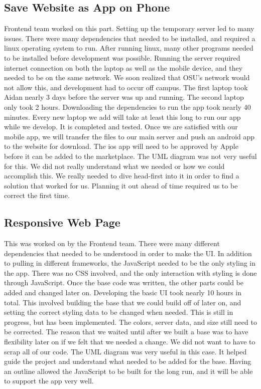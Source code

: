 \documentclass[12pt]{article}
\begin{document}
      \subsection{Save Website as App on Phone}
      Frontend team worked on this part.  Setting up the temporary server led to many issues. There were many dependencies that needed to be installed, and required a linux operating system to run. After running linux, many other programs needed to be installed before development was possible. Running the server required internet connection on both the laptop as well as the mobile device, and they needed to be on the same network. We soon realized that OSU’s network would not allow this, and development had to occur off campus. The first laptop took Aidan nearly 3 days before the server was up and running. The second laptop only took 2 hours. Downloading the dependencies to run the app took nearly 40 minutes. Every new laptop we add will take at least this long to run our app while we develop. It is completed and tested. Once we are satisfied with our mobile app, we will transfer the files to our main server and push an android app to the website for download. The ios app will need to be approved by Apple before it can be added to the marketplace. The UML diagram was not very useful for this. We did not really understand what we needed or how we could accomplish this. We really needed to dive head-first into it in order to find a solution that worked for us. Planning it out ahead of time required us to be correct the first time.
      \subsection{Responsive Web Page}
      This was worked on by the Frontend team. There were many different dependencies that needed to be understood in order to make the UI. In addition to pulling in different frameworks, the JavaScript needed to be the only styling in the app. There was no CSS involved, and the only interaction with styling is done through JavaScript. Once the base code was written, the other parts could be added and changed later on. Developing the basic UI took nearly 10 hours in total. This involved building the base that we could build off of later on, and setting the correct styling data to be changed when needed. This is still in progress, but has been implemented. The colors, server data, and size still need to be corrected. The reason that we waited until after we built a base was to have flexibility later on if we felt that we needed a change. We did not want to have to scrap all of our code. The UML diagram was very useful in this case. It helped guide the project and understand what needed to be added for the base. Having an outline allowed the JavaScript to be built for the long run, and it will be able to support the app very well.
\end{document}
